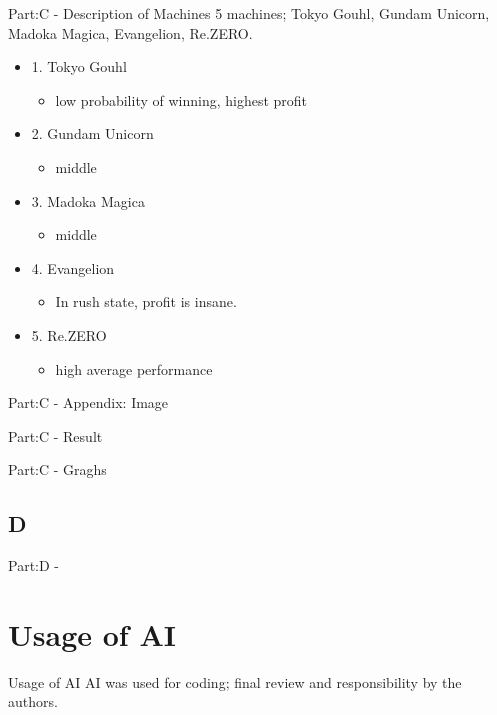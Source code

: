 \documentclass{beamer}
\begin{document}
\begin{frame}{Part:C - Description of Machines}
5 machines; Tokyo Gouhl, Gundam Unicorn, Madoka Magica, Evangelion, Re.ZERO.
\begin{itemize}
    \item 1. Tokyo Gouhl
    \begin{itemize}
        \item low probability of winning, highest profit
    \end{itemize}
    \item 2. Gundam Unicorn
    \begin{itemize}
        \item middle
    \end{itemize}
    \item 3. Madoka Magica 
    \begin{itemize}
        \item middle
    \end{itemize}
    \item 4. Evangelion
    \begin{itemize}
        \item In rush state, profit is insane.
    \end{itemize}
    \item 5. Re.ZERO
    \begin{itemize}
        \item high average performance
    \end{itemize}
\end{itemize}
\end{frame}

\begin{frame}{Part:C - Appendix: Image}
    
\end{frame}
\begin{frame}{Part:C - Result}

    
\end{frame}
\begin{frame}{Part:C - Graghs}

    
\end{frame}



\subsection{D}
\begin{frame}{Part:D -}
    
\end{frame}


\section{Usage of AI}
\begin{frame}{Usage of AI}
    AI was used for coding; final review and responsibility by the authors.
\end{frame}
\end{document}
